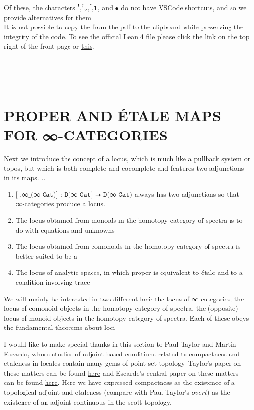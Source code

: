\documentclass{book}
\theoremstyle{definition}
\begin{document}

Of these, the characters $\texttt{ꜝ,ꜞ,𛲔,ॱ,𝟏}$, and $\texttt{∙}$ do not have VSCode shortcuts, and so we provide alternatives for them.\\

It is not possible to copy the from the pdf to the clipboard while preserving the integrity of the code. To see the official Lean 4 file please click the link on the top right of the front page or \href{https://github.com/linlib/CategoryTheory/tree/main}{this}.

\ \\
\ \\
\ \\


\part{PROPER AND ÉTALE MAPS FOR ∞-CATEGORIES}

Next we introduce the concept of a locus, which is much like a pullback system or topos, but which is both complete and cocomplete and features two adjunctions in its maps. ... 

\begin{enumerate}
\item $\texttt{[-,}$∞$\texttt{\_(}$∞$\texttt{-Cat)] : D(}$∞$\texttt{-Cat) ⭢ D(}$∞$\texttt{-Cat)}$ always has two adjunctions so that ∞-categories produce a locus.
\item The locus obtained from monoids in the homotopy category of spectra is to do with equations and unknowns
\item The locus obtained from comonoids in the homotopy category of spectra is better suited to be a 
\item The locus of analytic spaces, in which proper is equivalent to étale and to a condition involving trace
\end{enumerate} We will mainly be interested in two different loci: the locus of ∞-categories, the locus of comonoid objects in the homotopy category of spectra, the (opposite) locus of monoid objects in the homotopy category of spectra. Each of these obeys the fundamental theorems about loci 

I would like to make special thanks in this section to Paul Taylor and Martin Escardo, whose studies of adjoint-based conditions related to compactness and etaleness in locales contain many gems of point-set topology. Taylor's paper on these matters can be found \href{https://paultaylor.eu/ASD/foufct/foufct.pdf}{here} and Escardo's central paper on these matters can be found \href{https://www.cs.bham.ac.uk/~mhe/papers/barbados.pdf}{here}. Here we have expressed compactness as the existence of a topological adjoint and etaleness (compare with Paul Taylor's $\textit{overt}$) as the existence of an adjoint continuous in the scott topology. 
\end{document}
